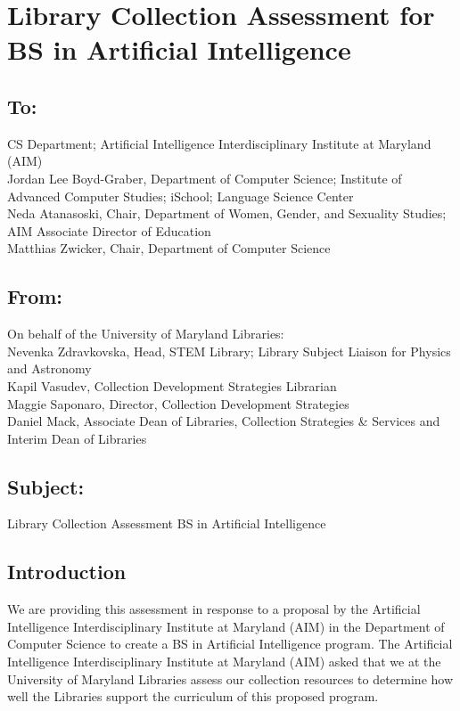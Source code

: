 
\section{Library Collection Assessment for BS in Artificial Intelligence}


\subsection*{To:}
CS Department; Artificial Intelligence Interdisciplinary Institute at Maryland (AIM)\\
Jordan Lee Boyd-Graber, Department of Computer Science; Institute of Advanced Computer Studies; iSchool; Language Science Center\\
Neda Atanasoski, Chair, Department of Women, Gender, and Sexuality Studies; AIM Associate Director of Education\\
Matthias Zwicker, Chair, Department of Computer Science

\subsection*{From:}
On behalf of the University of Maryland Libraries:\\
Nevenka Zdravkovska, Head, STEM Library; Library Subject Liaison for Physics and Astronomy\\
Kapil Vasudev, Collection Development Strategies Librarian\\
Maggie Saponaro, Director, Collection Development Strategies\\
Daniel Mack, Associate Dean of Libraries, Collection Strategies \& Services and Interim Dean of Libraries

\subsection*{Subject:}
Library Collection Assessment BS in Artificial Intelligence

\subsection*{Introduction}
We are providing this assessment in response to a proposal by the Artificial Intelligence Interdisciplinary Institute at Maryland (AIM) in the Department of Computer Science to create a BS in Artificial Intelligence program. The Artificial Intelligence Interdisciplinary Institute at Maryland (AIM) asked that we at the University of Maryland Libraries assess our collection resources to determine how well the Libraries support the curriculum of this proposed program.

